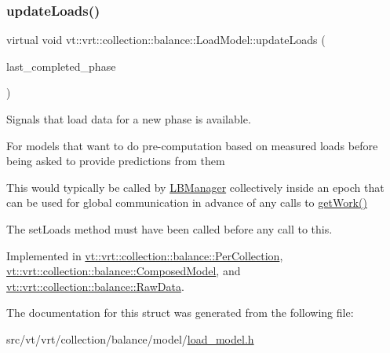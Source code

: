 \mbox{\label{structvt_1_1vrt_1_1collection_1_1balance_1_1_load_model_a4f1c6fb5d7d7a0b147755f025b1d5f5c}} 
\subsubsection{\texorpdfstring{update\+Loads()}{updateLoads()}}
{\footnotesize\ttfamily virtual void vt\+::vrt\+::collection\+::balance\+::\+Load\+Model\+::update\+Loads (\begin{DoxyParamCaption}\item[{\hyperlink{namespacevt_a46ce6733d5cdbd735d561b7b4029f6d7}{Phase\+Type}}]{last\+\_\+completed\+\_\+phase }\end{DoxyParamCaption})\hspace{0.3cm}{\ttfamily [pure virtual]}}



Signals that load data for a new phase is available. 

For models that want to do pre-\/computation based on measured loads before being asked to provide predictions from them

This would typically be called by \hyperlink{structvt_1_1vrt_1_1collection_1_1balance_1_1_l_b_manager}{L\+B\+Manager} collectively inside an epoch that can be used for global communication in advance of any calls to \hyperlink{structvt_1_1vrt_1_1collection_1_1balance_1_1_load_model_a430980cf8970bb3bf2b35d7ccf18799d}{get\+Work()}

The {\ttfamily set\+Loads} method must have been called before any call to this. 

Implemented in \hyperlink{structvt_1_1vrt_1_1collection_1_1balance_1_1_per_collection_a2b41fbbe2b684654f8dbfd9207b77501}{vt\+::vrt\+::collection\+::balance\+::\+Per\+Collection}, \hyperlink{classvt_1_1vrt_1_1collection_1_1balance_1_1_composed_model_ad8108b4392d63b7f09e443920a64933a}{vt\+::vrt\+::collection\+::balance\+::\+Composed\+Model}, and \hyperlink{structvt_1_1vrt_1_1collection_1_1balance_1_1_raw_data_a4aaae24a53ead0248b873911ce560a34}{vt\+::vrt\+::collection\+::balance\+::\+Raw\+Data}.



The documentation for this struct was generated from the following file\+:\begin{DoxyCompactItemize}
\item 
src/vt/vrt/collection/balance/model/\hyperlink{load__model_8h}{load\+\_\+model.\+h}\end{DoxyCompactItemize}
